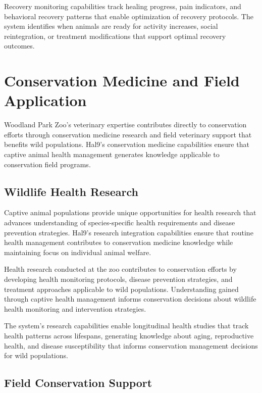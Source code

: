 \documentclass[
  Letterpaper,
]{scrbook}
\begin{document}
Recovery monitoring capabilities track healing progress, pain
indicators, and behavioral recovery patterns that enable optimization of
recovery protocols. The system identifies when animals are ready for
activity increases, social reintegration, or treatment modifications
that support optimal recovery outcomes.

\section{Conservation Medicine and Field
Application}\label{conservation-medicine-and-field-application}

Woodland Park Zoo's veterinary expertise contributes directly to
conservation efforts through conservation medicine research and field
veterinary support that benefits wild populations. Hal9's conservation
medicine capabilities ensure that captive animal health management
generates knowledge applicable to conservation field programs.

\subsection{Wildlife Health Research}\label{wildlife-health-research}

Captive animal populations provide unique opportunities for health
research that advances understanding of species-specific health
requirements and disease prevention strategies. Hal9's research
integration capabilities ensure that routine health management
contributes to conservation medicine knowledge while maintaining focus
on individual animal welfare.

Health research conducted at the zoo contributes to conservation efforts
by developing health monitoring protocols, disease prevention
strategies, and treatment approaches applicable to wild populations.
Understanding gained through captive health management informs
conservation decisions about wildlife health monitoring and intervention
strategies.

The system's research capabilities enable longitudinal health studies
that track health patterns across lifespans, generating knowledge about
aging, reproductive health, and disease susceptibility that informs
conservation management decisions for wild populations.

\subsection{Field Conservation
Support}\label{field-conservation-support}
\end{document}
